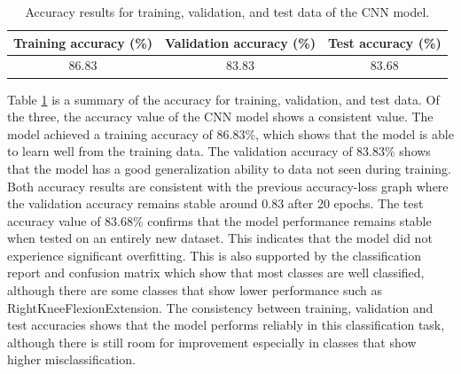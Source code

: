 \begin{table}[h!]
	\caption{Accuracy results for training, validation, and test data of the CNN model.}
	\label{tab:CNNAccuracy}
	\centering
	\begin{tabular}{|c|c|c|}
		\hline
		Training accuracy (\%) & Validation accuracy (\%) & Test accuracy (\%) \\ \hline
		86.83                  & 83.83                    & 83.68              \\ \hline
	\end{tabular}
\end{table}

Table \ref{tab:CNNAccuracy} is a summary of the accuracy for training, validation, and test data. Of the three, the accuracy value of the CNN model shows a consistent value. The model achieved a training accuracy of 86.83\%, which shows that the model is able to learn well from the training data. The validation accuracy of 83.83\% shows that the model has a good generalization ability to data not seen during training. Both accuracy results are consistent with the previous accuracy-loss graph where the validation accuracy remains stable around 0.83 after 20 epochs. The test accuracy value of 83.68\% confirms that the model performance remains stable when tested on an entirely new dataset. This indicates that the model did not experience significant overfitting. This is also supported by the classification report and confusion matrix which show that most classes are well classified, although there are some classes that show lower performance such as RightKneeFlexionExtension. The consistency between training, validation and test accuracies shows that the model performs reliably in this classification task, although there is still room for improvement especially in classes that show higher misclassification.

